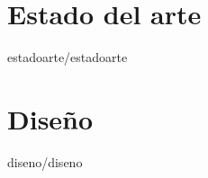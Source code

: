 \documentclass[epsbased,copyright,final,printable,covers,extendedindex,firstnumbered,tfg,gnuplot]{tfgtfmthesisuam}
\begin{document}
\chapter{Estado del arte\label{CAP:ESTADOARTE}}{estadoarte/estadoarte}
\begin{comment}
  \section{Título, autor, tutor y otras variables\label{SEC:VARIABLES}}{estructura/titulo}
  \section{Índices\label{SEC:INDICES}}{estructura/indices}
  \section{Copyright, dedicatoria y cita inicial\label{SEC:COPYRIGHT}}{estructura/copyright}
  \section[Prefacio, resumen ...]{Prefacio, resumen, abstract, agradecimientos y palabras clave.\label{SEC:PREFACIO}}{estructura/prefacioresumen}
  \section[Partes, capítulos ...]{Partes, capítulos, apartados, subapartados, subsubapartados, párrafos y subpárrafos\label{SEC:CAPITULOS}}{estructura/capitulos}
  \section[Glosario, acrónimos y definiciones]{Glosario, acrónimos y definiciones\label{SEC:GLOSARIO}}{estructura/glosario}
  \section{Referencias\label{SEC:REFERENCIAS}}{estructura/referencias}
  \section{Bibliografía\label{SEC:BIBLIOGRAFIA}}{estructura/bibliografia}
\end{comment}


\chapter{Diseño\label{CAP:DISEÑO}}{diseno/diseno}
\end{document}
